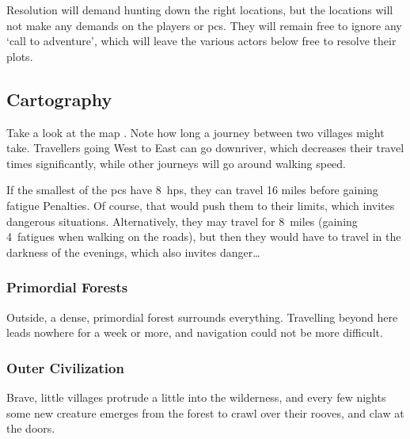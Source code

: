 Resolution will demand hunting down the right locations, but the locations will not make any demands on the players or \glspl{pc}.
They will remain free to ignore any `call to adventure', which will leave the various actors below free to resolve their plots.


\printglossary[
  type=people,
  style=topicmcols,
]

\bigLine

\begin{multicols}{2}

\subsection{Cartography}

Take a look at the map .
Note how long a journey between two \glspl{village} might take.
Travellers going West to East can go downriver, which decreases their travel times significantly, while other journeys will go around walking speed.

If the smallest of the \glspl{pc} have 8~\glspl{hp}, they can travel 16 miles before gaining \gls{fatigue} Penalties.
Of course, that would push them to their limits, which invites dangerous situations.
Alternatively, they may travel for 8~miles (gaining 4~\glspl{fatigue} when walking on the roads), but then they would have to travel in the darkness of the evenings, which also invites danger\ldots

\subsubsection{Primordial Forests}
Outside, a dense, primordial forest surrounds everything.
Travelling beyond here leads nowhere for a week or more, and navigation could not be more difficult.

\subsubsection{Outer Civilization}
Brave, little \glspl{village} protrude a little into the wilderness, and every few nights some new creature emerges from the forest to crawl over their rooves, and claw at the doors.


\end{multicols}
